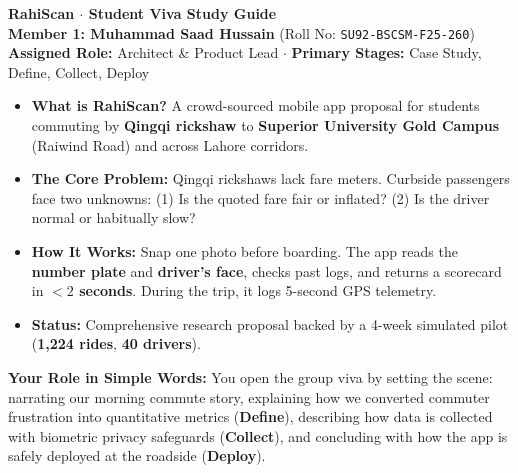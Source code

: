 \documentclass[10pt, a4paper]{article}
\begin{document}
\begin{tcolorbox}[enhanced, colback=navyblue, colframe=navyblue, arc=3pt, left=8pt, right=8pt, top=4pt, bottom=4pt]
  {\fontsize{15pt}{17pt}\selectfont\color{white}\bfseries RahiScan \(\cdot\) Student Viva Study Guide}\\[1.5pt]
  {\fontsize{10pt}{12pt}\selectfont\color{softteal}\textbf{Member 1: Muhammad Saad Hussain} (Roll No: \texttt{SU92-BSCSM-F25-260})}\\[1pt]
  {\fontsize{8.5pt}{10.5pt}\selectfont\color{white!85!softblue}\textbf{Assigned Role:} Architect \& Product Lead \(\cdot\) \textbf{Primary Stages:} Case Study, Define, Collect, Deploy}
\end{tcolorbox}

\begin{overviewbox}
\footnotesize
\begin{itemize}\setlength{\itemsep}{0.8pt}\setlength{\parskip}{0pt}
  \item \textbf{What is RahiScan?} A crowd-sourced mobile app proposal for students commuting by \textbf{Qingqi rickshaw} to \textbf{Superior University Gold Campus} (Raiwind Road) and across Lahore corridors.
  \item \textbf{The Core Problem:} Qingqi rickshaws lack fare meters. Curbside passengers face two unknowns: (1) Is the quoted fare fair or inflated? (2) Is the driver normal or habitually slow?
  \item \textbf{How It Works:} Snap one photo before boarding. The app reads the \textbf{number plate} and \textbf{driver's face}, checks past logs, and returns a scorecard in \textbf{\(< 2\) seconds}. During the trip, it logs 5-second GPS telemetry.
  \item \textbf{Status:} Comprehensive research proposal backed by a 4-week simulated pilot (\textbf{1,224 rides}, \textbf{40 drivers}).
\end{itemize}
\end{overviewbox}

\begin{tcolorbox}[enhanced, colback=white, colframe=bordergray, boxrule=0.4pt, arc=2.5pt, left=6pt, right=6pt, top=2.5pt, bottom=2.5pt]
  \footnotesize \textbf{Your Role in Simple Words:} You open the group viva by setting the scene: narrating our morning commute story, explaining how we converted commuter frustration into quantitative metrics (\textbf{Define}), describing how data is collected with biometric privacy safeguards (\textbf{Collect}), and concluding with how the app is safely deployed at the roadside (\textbf{Deploy}).
\end{tcolorbox}
\end{document}
